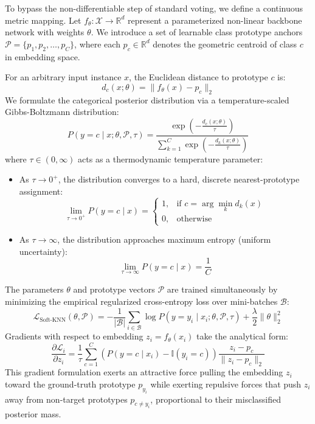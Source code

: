 To bypass the non-differentiable step of standard voting, we define a
continuous metric mapping. Let
\(f_\theta: \mathcal{X} \to \mathbb{R}^d\) represent a parameterized
non-linear backbone network with weights \(\theta\). We introduce a set
of learnable class prototype anchors
\(\mathcal{P} = \{p_1, p_2, \dots, p_C\}\), where each
\(p_c \in \mathbb{R}^d\) denotes the geometric centroid of class \(c\)
in embedding space.

For an arbitrary input instance \(x\), the Euclidean distance to
prototype \(c\) is: \[d_c(x; \theta) = \|f_\theta(x) - p_c\|_2\] We
formulate the categorical posterior distribution via a
temperature-scaled Gibbs-Boltzmann distribution:
\[P(y = c \mid x; \theta, \mathcal{P}, \tau) = \frac{\exp\left( -\frac{d_c(x; \theta)}{\tau} \right)}{\sum_{k=1}^{C} \exp\left( -\frac{d_k(x; \theta)}{\tau} \right)}\]
where \(\tau \in (0, \infty)\) acts as a thermodynamic temperature
parameter:

\begin{itemize}
\tightlist
\item
  As \(\tau \to 0^+\), the distribution converges to a hard, discrete
  nearest-prototype assignment:
  \[\lim_{\tau \to 0^+} P(y = c \mid x) = \begin{cases} 1, & \text{if } c = \arg\min_k d_k(x) \\ 0, & \text{otherwise} \end{cases}\]
\item
  As \(\tau \to \infty\), the distribution approaches maximum entropy
  (uniform uncertainty):
  \[\lim_{\tau \to \infty} P(y = c \mid x) = \frac{1}{C}\]
\end{itemize}

The parameters \(\theta\) and prototype vectors \(\mathcal{P}\) are
trained simultaneously by minimizing the empirical regularized
cross-entropy loss over mini-batches \(\mathcal{B}\):
\[\mathcal{L}_{\text{Soft-KNN}}(\theta, \mathcal{P}) = -\frac{1}{|\mathcal{B}|} \sum_{i \in \mathcal{B}} \log P(y = y_i \mid x_i; \theta, \mathcal{P}, \tau) + \frac{\lambda}{2} \|\theta\|_2^2\]
Gradients with respect to embedding \(z_i = f_\theta(x_i)\) take the
analytical form:
\[\frac{\partial \mathcal{L}_i}{\partial z_i} = \frac{1}{\tau} \sum_{c=1}^{C} (P(y = c \mid x_i) - \mathbb{I}(y_i = c)) \frac{z_i - p_c}{\|z_i - p_c\|_2}\]
This gradient formulation exerts an attractive force pulling the
embedding \(z_i\) toward the ground-truth prototype \(p_{y_i}\) while
exerting repulsive forces that push \(z_i\) away from non-target
prototypes \(p_{c \ne y_i}\), proportional to their misclassified
posterior mass.

